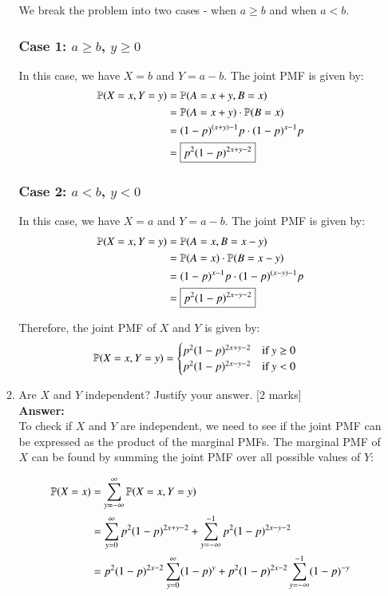 \documentclass[12pt]{article}
\begin{document}
\begin{enumerate}
\begin{enumerate}
We break the problem into two cases - when $a\geq b$ and when $a<b$.

\subsubsection*{Case 1: $a\geq b$, $y \geq 0$}

In this case, we have $X = b$ and $Y = a-b$. The joint PMF is given by:
\begin{align*}
{\mathbb P}(X=x, Y=y) &= {\mathbb P}(A = x + y, B=x) \\
&= {\mathbb P}(A = x+y) \cdot {\mathbb P}(B=x) \\
&= (1-p)^{(x+y)-1}p \cdot (1-p)^{x-1}p \\
&= \boxed{p^2(1-p)^{2x+y-2}} \\
\end{align*}

\subsubsection*{Case 2: $a<b$, $y < 0$}
In this case, we have $X = a$ and $Y = a-b$. The joint PMF is given by:
\begin{align*}
{\mathbb P}(X=x, Y=y) &= {\mathbb P}(A = x, B=x-y) \\
&= {\mathbb P}(A = x) \cdot {\mathbb P}(B=x-y) \\
&= (1-p)^{x-1}p \cdot (1-p)^{(x-y)-1}p \\
&= \boxed{p^2(1-p)^{2x-y-2}} \\
\end{align*}

Therefore, the joint PMF of $X$ and $Y$ is given by:
\begin{align*}
{\mathbb P}(X=x, Y=y) &= \begin{cases}
p^2(1-p)^{2x+y-2} & \text{if } y \geq 0 \\
p^2(1-p)^{2x-y-2} & \text{if } y < 0
\end{cases}
\end{align*}


\item Are $X$ and $Y$ independent? Justify your answer.  
			\hfill [2 marks]
%
\\
\textbf{Answer:}
\\
To check if $X$ and $Y$ are independent, we need to see if the joint PMF can be expressed as the product of the marginal PMFs.
The marginal PMF of $X$ can be found by summing the joint PMF over all possible values of $Y$:

\begin{align*}
{\mathbb P}(X=x) &= \sum_{y=-\infty}^{\infty} {\mathbb P}(X=x, Y=y) \\
&= \sum_{y=0}^{\infty} p^2(1-p)^{2x+y-2} + \sum_{y=-\infty}^{-1} p^2(1-p)^{2x-y-2} \\
&= p^2(1-p)^{2x-2} \sum_{y=0}^{\infty} (1-p)^{y} + p^2(1-p)^{2x-2} \sum_{y=-\infty}^{-1} (1-p)^{-y} \\
\end{align*}


\end{enumerate}
\end{enumerate}
\end{document}
